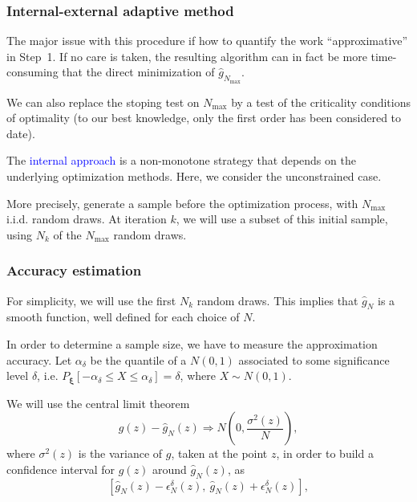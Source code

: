 \documentclass{beamer}
\def\bxi{\boldsymbol\xi}
\begin{document}
\begin{frame}
\frametitle{Internal-external adaptive method}

The major issue with this procedure if how to quantify the work ``approximative'' in Step~1.
If no care is taken, the resulting algorithm can in fact be more time-consuming that the direct minimization of $\hat{g}_{N_{\max}}$.

We can also replace the stoping test on $N_{\max}$ by a test of the criticality conditions of optimality (to our best knowledge, only the first order has been considered to date).

\mbox{}

The \textcolor{blue}{internal approach} is a non-monotone strategy that depends on the underlying optimization methods.
Here, we consider the unconstrained case.

\mbox{}

More precisely, generate a sample before the optimization process, with $N_{\max}$ i.i.d. random draws.
At iteration $k$, we will use a subset of this initial sample, using $N_k$ of the $N_{\max}$ random draws.

\end{frame}

\begin{frame}
\frametitle{Accuracy estimation}

For simplicity, we will use the first $N_k$ random draws.
This implies that $\hat{g}_N$ is a smooth function, well defined for each choice of $N$.

\mbox{}

In order to determine a sample size, we have to measure the approximation accuracy.
Let $\alpha_{\delta}$ be the quantile of a $N(0,1)$ associated to some significance level $\delta$, i.e. $P_{\bxi} [ -\alpha_{\delta} \leq X \leq \alpha_{\delta} ] = \delta$, where $X \sim N(0,1)$.

\mbox{}

We will use the central limit theorem
\[
g(z) - \hat{g}_N(z) \Rightarrow N \left( 0, \frac{\sigma^2(z)}{N} \right),
\]
where $\sigma^2(z)$ is the variance of $g$, taken at the point $z$, in order to build a confidence interval for $g(z)$ around $\hat{g}_N(z)$, as
\[
[\hat{g}_N(z) - \epsilon^{\delta}_N(z),\ \hat{g}_N(z) + \epsilon^{\delta}_N(z)],
\]

\end{frame}
\end{document}
